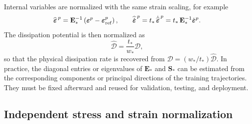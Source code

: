 \documentclass[11pt]{article}
\begin{document}
Internal variables are normalized with the same strain scaling, for example
\begin{equation}
    \widehat{\boldsymbol{\varepsilon}}^{\,p}
      =\mathbf{E}_*^{-1}
       \left(\boldsymbol{\varepsilon}^{p}
             -\boldsymbol{\varepsilon}^{p}_{\rm ref}\right),
    \qquad
    \widehat{\dot{\boldsymbol{\varepsilon}}}^{\,p}
      =t_*\,\dot{\widehat{\boldsymbol{\varepsilon}}}^{\,p}
      =t_*\,\mathbf{E}_*^{-1}
       \dot{\boldsymbol{\varepsilon}}^{p}.
\end{equation}
The dissipation potential is then normalized as
\begin{equation}
    \widehat{\mathcal{D}}
      =\frac{t_*}{w_*}\mathcal{D},
\end{equation}
so that the physical dissipation rate is recovered from
$\mathcal{D}=(w_*/t_*)\widehat{\mathcal{D}}$.  In practice, the diagonal
entries or eigenvalues of $\mathbf{E}_*$ and $\mathbf{S}_*$ can be estimated
from the corresponding components or principal directions of the training
trajectories.  They must be fixed afterward and reused for validation,
testing, and deployment.

\subsection{Independent stress and strain normalization}
\end{document}
